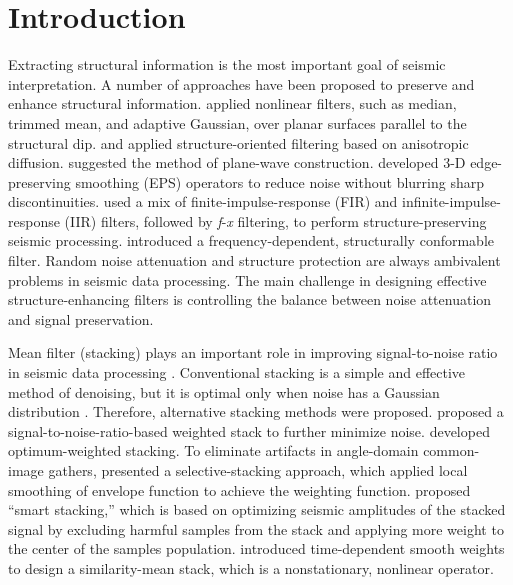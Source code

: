 \section{Introduction}

Extracting structural information is the most important goal of
seismic interpretation. A number of approaches
have been proposed to preserve and enhance structural
information. \cite{Hoeber06} applied nonlinear filters, such as
median, trimmed mean, and adaptive Gaussian, over planar surfaces
parallel to the structural dip. \cite{Fehmers03} and \cite{Hale09}
applied structure-oriented filtering based on anisotropic
diffusion. \cite{Fomel06b} suggested the method of plane-wave
construction. \cite{AlBinHassan06} developed 3-D edge-preserving
smoothing (EPS) operators to reduce noise without blurring sharp
discontinuities. \cite{Traonmilin08} used a mix of
finite-impulse-response (FIR) and infinite-impulse-response (IIR)
filters, followed by \emph{f}-\emph{x} filtering, to perform
structure-preserving seismic processing. \cite{Whitcombe08} introduced
a frequency-dependent, structurally conformable filter. Random noise
attenuation and structure protection are always ambivalent problems in
seismic data processing. The main challenge in designing effective
structure-enhancing filters is controlling the balance between noise
attenuation and signal preservation.

Mean filter (stacking) plays an important role in improving
signal-to-noise ratio in seismic data processing
\cite[]{Yilmaz01}. Conventional stacking is a simple and effective
method of denoising, but it is optimal only when noise has a Gaussian
distribution \cite[]{Mayne62}. Therefore, alternative stacking methods
were proposed. \cite{Robinson70} proposed a
signal-to-noise-ratio-based weighted stack to further minimize
noise. \cite{Tyapkin05} developed optimum-weighted stacking. To
eliminate artifacts in angle-domain common-image gathers,
\cite{Tang07} presented a selective-stacking approach, which applied
local smoothing of envelope function to achieve the weighting
function. \cite{Rashed08} proposed ``smart stacking,'' which is based
on optimizing seismic amplitudes of the stacked signal by excluding
harmful samples from the stack and applying more weight to the center
of the samples population. \cite{Liu09b} introduced time-dependent
smooth weights to design a similarity-mean stack, which is a
nonstationary, nonlinear operator.

